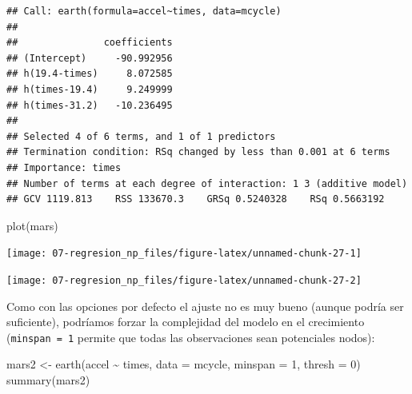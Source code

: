 \documentclass[
]{book}
\newenvironment{Shaded}{\begin{snugshade}}{\end{snugshade}}
\newcommand{\AttributeTok}[1]{\textcolor[rgb]{0.77,0.63,0.00}{#1}}
\newcommand{\DecValTok}[1]{\textcolor[rgb]{0.00,0.00,0.81}{#1}}
\newcommand{\FunctionTok}[1]{\textcolor[rgb]{0.00,0.00,0.00}{#1}}
\newcommand{\NormalTok}[1]{#1}
\newcommand{\OtherTok}[1]{\textcolor[rgb]{0.56,0.35,0.01}{#1}}
\newcommand{\SpecialCharTok}[1]{\textcolor[rgb]{0.00,0.00,0.00}{#1}}
\newcommand{\StringTok}[1]{\textcolor[rgb]{0.31,0.60,0.02}{#1}}
\theoremstyle{break}
\theoremstyle{definition}
\theoremstyle{definition}
\theoremstyle{definition}
\theoremstyle{definition}
\theoremstyle{remark}
\begin{document}
\begin{verbatim}
## Call: earth(formula=accel~times, data=mcycle)
## 
##               coefficients
## (Intercept)     -90.992956
## h(19.4-times)     8.072585
## h(times-19.4)     9.249999
## h(times-31.2)   -10.236495
## 
## Selected 4 of 6 terms, and 1 of 1 predictors
## Termination condition: RSq changed by less than 0.001 at 6 terms
## Importance: times
## Number of terms at each degree of interaction: 1 3 (additive model)
## GCV 1119.813    RSS 133670.3    GRSq 0.5240328    RSq 0.5663192
\end{verbatim}

\begin{Shaded}
\begin{Highlighting}[]
\FunctionTok{plot}\NormalTok{(mars)}
\end{Highlighting}
\end{Shaded}

\begin{center}\texttt{[image: 07-regresion\_np\_files/figure-latex/unnamed-chunk-27-1]} \end{center}

\begin{Shaded}
\end{Shaded}

\begin{center}\texttt{[image: 07-regresion\_np\_files/figure-latex/unnamed-chunk-27-2]} \end{center}

Como con las opciones por defecto el ajuste no es muy bueno (aunque podría ser suficiente), podríamos forzar la complejidad del modelo en el crecimiento (\texttt{minspan\ =\ 1} permite que todas las observaciones sean potenciales nodos):

\begin{Shaded}
\begin{Highlighting}[]
\NormalTok{mars2 }\OtherTok{\textless{}{-}} \FunctionTok{earth}\NormalTok{(accel }\SpecialCharTok{\textasciitilde{}}\NormalTok{ times, }\AttributeTok{data =}\NormalTok{ mcycle, }\AttributeTok{minspan =} \DecValTok{1}\NormalTok{, }\AttributeTok{thresh =} \DecValTok{0}\NormalTok{)}
\FunctionTok{summary}\NormalTok{(mars2)}
\end{Highlighting}
\end{Shaded}
\end{document}
